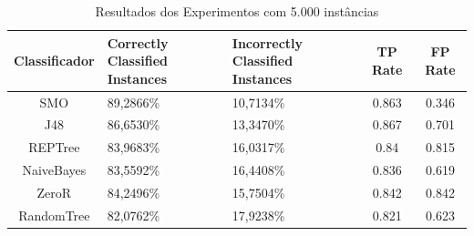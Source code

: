 \documentclass[
	12pt,				%
	openright,			%
	oneside,	
	a4paper,				%
	english,				%
	brazil				%
]{abntex2/abntex2} %
\begin{document}
		
		\begin{table}[htbp]
			\centering
			\caption{Resultados dos Experimentos com 5.000 instâncias}
			\label{tabResultadosExperimentos5k}
			\begin{center}
	\renewcommand{\arraystretch}{2}
	\begin{tabular}{cp{3cm}p{3.2cm}cc}
		\hline
		\textbf{Classificador}                & \textbf{Correctly Classified Instances}               & \textbf{Incorrectly Classified Instances}      	& \textbf{TP Rate}						&\textbf{FP Rate}   \\ \hline
		SMO                                      & 89,2866\%                                                                                 & 10,7134\% 							&0.863									&0.346                                                                                    \\
		J48                                      & 86,6530\%                                                                                  & 13,3470\% 							&0.867										&0.701                                                                                     \\
		REPTree                                  & 83,9683\%                                                                                 & 16,0317\%								&0.84											&0.815                                                                                     \\
		NaiveBayes                               & 83,5592\%                                                                                 & 16,4408\%								&0.836												&0.619                                                                                     \\ \hline \hline
		ZeroR    									& 84,2496\%                                                 									& 15,7504\%								&0.842											&0.842                                                     								\\
		RandomTree                               & 82,0762\%                                                                                 & 17,9238\%									&0.821												&0.623                                                                                     \\ \hline
	\end{tabular}
\end{center}
\end{table}
		
\end{document}
